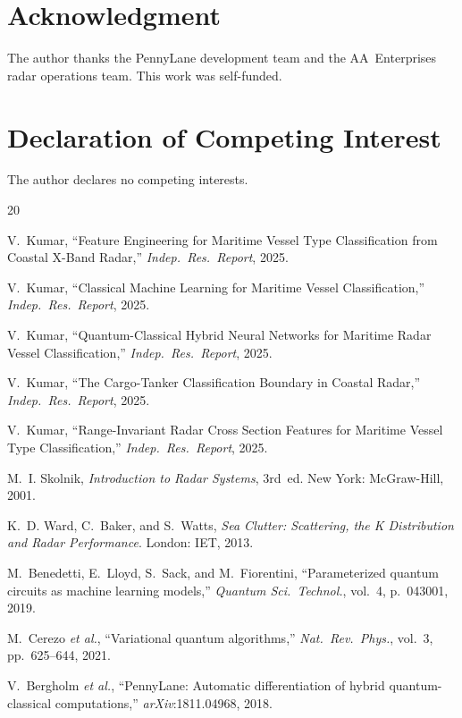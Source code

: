 \documentclass[journal]{IEEEtran}
\begin{document}
\section*{Acknowledgment}
The author thanks the PennyLane development team and the AA~Enterprises
radar operations team. This work was self-funded.

\section*{Declaration of Competing Interest}
The author declares no competing interests.


\begin{thebibliography}{20}

V.~Kumar, ``Feature Engineering for Maritime Vessel Type Classification
from Coastal X-Band Radar,'' \emph{Indep.\ Res.\ Report}, 2025.

V.~Kumar, ``Classical Machine Learning for Maritime Vessel Classification,''
\emph{Indep.\ Res.\ Report}, 2025.

V.~Kumar, ``Quantum-Classical Hybrid Neural Networks for Maritime Radar
Vessel Classification,'' \emph{Indep.\ Res.\ Report}, 2025.

V.~Kumar, ``The Cargo-Tanker Classification Boundary in Coastal Radar,''
\emph{Indep.\ Res.\ Report}, 2025.

V.~Kumar, ``Range-Invariant Radar Cross Section Features for Maritime
Vessel Type Classification,'' \emph{Indep.\ Res.\ Report}, 2025.

M.~I. Skolnik, \emph{Introduction to Radar Systems}, 3rd~ed.
New York: McGraw-Hill, 2001.

K.~D. Ward, C.~Baker, and S.~Watts, \emph{Sea Clutter: Scattering,
the K Distribution and Radar Performance}. London: IET, 2013.

M.~Benedetti, E.~Lloyd, S.~Sack, and M.~Fiorentini,
``Parameterized quantum circuits as machine learning models,''
\emph{Quantum Sci.\ Technol.}, vol.~4, p.~043001, 2019.

M.~Cerezo \emph{et al.}, ``Variational quantum algorithms,''
\emph{Nat.\ Rev.\ Phys.}, vol.~3, pp.~625--644, 2021.

V.~Bergholm \emph{et al.}, ``PennyLane: Automatic differentiation of
hybrid quantum-classical computations,''
\emph{arXiv}:1811.04968, 2018.


\end{thebibliography}
\end{document}
